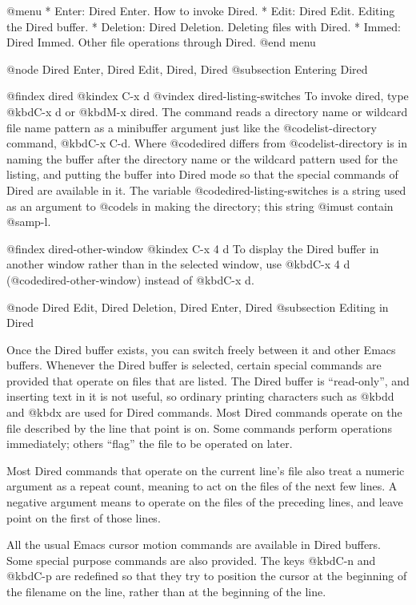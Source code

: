 {{{{{{{{{{{{{{{{{{{@menu
* Enter: Dired Enter.         How to invoke Dired.
* Edit: Dired Edit.           Editing the Dired buffer.
* Deletion: Dired Deletion.   Deleting files with Dired.
* Immed: Dired Immed.         Other file operations through Dired.
@end menu

@node Dired Enter, Dired Edit, Dired, Dired
@subsection Entering Dired

@findex dired
@kindex C-x d
@vindex dired-listing-switches
  To invoke dired, type @kbd{C-x d} or @kbd{M-x dired}.  The command reads a
directory name or wildcard file name pattern as a minibuffer argument just
like the @code{list-directory} command, @kbd{C-x C-d}.  Where @code{dired}
differs from @code{list-directory} is in naming the buffer after the
directory name or the wildcard pattern used for the listing, and putting
the buffer into Dired mode so that the special commands of Dired are
available in it.  The variable @code{dired-listing-switches} is a string
used as an argument to @code{ls} in making the directory; this string
@i{must} contain @samp{-l}.

@findex dired-other-window
@kindex C-x 4 d
  To display the Dired buffer in another window rather than in the selected
window, use @kbd{C-x 4 d} (@code{dired-other-window)} instead of @kbd{C-x d}.

@node Dired Edit, Dired Deletion, Dired Enter, Dired
@subsection Editing in Dired

  Once the Dired buffer exists, you can switch freely between it and other
Emacs buffers.  Whenever the Dired buffer is selected, certain special
commands are provided that operate on files that are listed.  The Dired
buffer is ``read-only'', and inserting text in it is not useful, so
ordinary printing characters such as @kbd{d} and @kbd{x} are used for Dired
commands.  Most Dired commands operate on the file described by the line
that point is on.  Some commands perform operations immediately; others
``flag'' the file to be operated on later.

  Most Dired commands that operate on the current line's file also treat a
numeric argument as a repeat count, meaning to act on the files of the
next few lines.  A negative argument means to operate on the files of the
preceding lines, and leave point on the first of those lines.

  All the usual Emacs cursor motion commands are available in Dired
buffers.  Some special purpose commands are also provided.  The keys
@kbd{C-n} and @kbd{C-p} are redefined so that they try to position
the cursor at the beginning of the filename on the line, rather than
at the beginning of the line.

}}}}}}}}}}}}}}}}}}}
